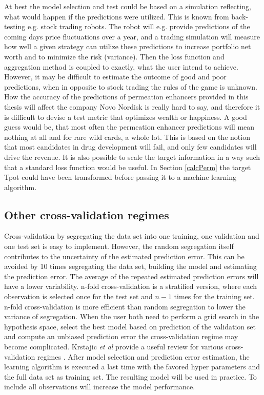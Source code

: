 At best the model selection and test could be based on a simulation reflecting, what would happen if the predictions were utilized. This is known from back-testing e.g. stock trading robots. The robot will e.g. provide predictions of the coming days price fluctuations over a year, and a trading simulation will measure how well a given strategy can utilize these predictions to increase portfolio net worth and to minimize the risk (variance). Then the loss function and aggregation method is coupled to exactly, what the user intend to achieve. However, it may be difficult to estimate the outcome of good and poor predictions, when in opposite to stock trading the rules of the game is unknown. How the accuracy of the predictions of permeation enhancers provided in this thesis will affect the company Novo Nordisk is really hard to say, and therefore it is difficult to devise a test metric that optimizes wealth or happiness. A good guess would be, that most often the permeation enhancer predictions will mean nothing at all and for rare wild cards, a whole lot. This is based on the notion that most candidates in drug development will fail, and only few candidates will drive the revenue. It is also possible to scale the target information in a way such that a standard loss function would be useful. In Section \ref{calcPerm} the target Tpot could have been transformed before passing it to a machine learning algorithm. 

\subsection{Other cross-validation regimes}
Cross-validation by segregating the data set into one training, one validation and one test set is easy to implement. However, the random segregation itself contributes to the uncertainty of the estimated prediction error. This can be avoided by 10 times segregating the data set, building the model and estimating the prediction error. The average of the repeated estimated prediction errors will have a lower variability. n-fold cross-validation is a stratified version, where each observation is selected once for the test set and $n-1$ times for the training set. n-fold cross-validation is more efficient than random segregation to lower the variance of segregation. When the user both need to perform a grid search in the hypothesis space, select the best model based on prediction of the validation set and compute an unbiased  prediction error the cross-validation regime may become complicated. Krstajic \textit{et al} provide a useful review for various cross-validation regimes \cite{krstajic2014cross}. After model selection and prediction error estimation, the learning algorithm is executed a last time with the favored hyper parameters and the full data set as training set. The resulting model will be used in practice. To include all observations will increase the model performance.

